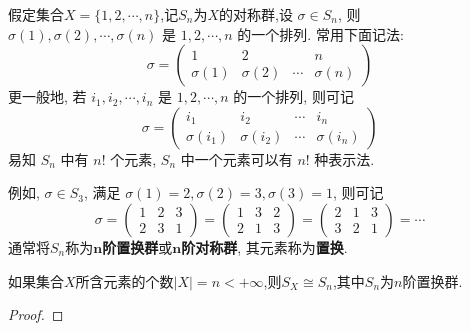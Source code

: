\documentclass[../../main.tex]{subfiles}%
\begin{document}
\begin{definition}
假定集合\( X = \{1, 2, \cdots, n\} \),记$S_n$为$X$的对称群,设 \( \sigma \in S_n \), 则 \( \sigma(1), \sigma(2), \cdots, \sigma(n) \) 是 \( 1, 2, \cdots, n \) 的一个排列. 常用下面记法:
\[
\sigma = \begin{pmatrix} 1 & 2 & & n \\ \sigma(1) & \sigma(2) & \cdots & \sigma(n) \end{pmatrix}
\]
更一般地, 若 \( i_1, i_2, \cdots, i_n \) 是 \( 1, 2, \cdots, n \) 的一个排列, 则可记
\[
\sigma = \begin{pmatrix} i_1 & i_2 & \cdots & i_n \\ \sigma(i_1) & \sigma(i_2) & \cdots & \sigma(i_n) \end{pmatrix}
\]
易知 \( S_n \) 中有 \( n! \) 个元素, \( S_n \) 中一个元素可以有 \( n! \) 种表示法.

例如, \( \sigma \in S_3 \), 满足 \( \sigma(1) = 2, \sigma(2) = 3, \sigma(3) = 1 \), 则可记
\[
\sigma = \begin{pmatrix} 1 & 2 & 3 \\ 2 & 3 & 1 \end{pmatrix} = \begin{pmatrix} 1 & 3 & 2 \\ 2 & 1 & 3 \end{pmatrix} = \begin{pmatrix} 2 & 1 & 3 \\ 3 & 2 & 1 \end{pmatrix} = \cdots
\]
通常将$S_n$称为$\bm{n}$\textbf{阶置换群}或$\bm{n}$\textbf{阶对称群}, 其元素称为\textbf{置换}.
\end{definition}

\begin{theorem}\label{theorem:n个文字的置换群同构于n阶置换群}
如果集合$X$所含元素的个数\( |X| = n < +\infty \),则$S_X\cong S_n$,其中$S_n$为$n$阶置换群.
\end{theorem}
\begin{proof}



\end{proof}
\end{document}
